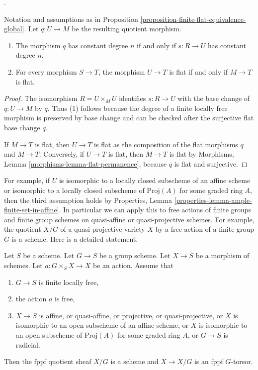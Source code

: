 \begin{lemma}
\label{lemma-finite-flat-equivalence-rank-flatness}
\begin{reference}
\cite[Expos\'e 212, Corollaire 5.5, p. 112]{FGA}.
\end{reference}
Notation and assumptions as in
Proposition \ref{proposition-finite-flat-equivalence-global}. Let
$q : U \to M$ be the resulting quotient morphism.
\begin{enumerate}
\item The morphism $q$ has constant degree $n$ if and only if
$s : R \to U$ has constant degree $n$.
\item For every morphism $S \to T$, the morphism $U \to T$ is flat if
and only if $M \to T$ is flat.
\end{enumerate}
\end{lemma}

\begin{proof}
The isomorphism $R = U \times_M U$ identifies $s : R \to U$ with the
base change of $q : U \to M$ by $q$. Thus (1) follows because the degree of
a finite locally free morphism is preserved by base change and can be checked
after the surjective flat base change $q$.

If $M \to T$ is flat, then $U \to T$ is flat as the composition of the flat
morphisms $q$ and $M \to T$. Conversely, if $U \to T$ is flat, then
$M \to T$ is flat by Morphisms, Lemma
\ref{morphisms-lemma-flat-permanence}, because $q$ is flat and surjective.
\end{proof}

\noindent
For example, if $U$ is isomorphic to a locally closed subscheme of an
affine scheme or isomorphic to a locally closed subscheme of
$\text{Proj}(A)$ for some graded ring $A$, then the third assumption holds by
Properties, Lemma \ref{properties-lemma-ample-finite-set-in-affine}.
In particular we can apply this to free actions of finite groups and
finite group schemes on quasi-affine or quasi-projective schemes.
For example, the quotient $X/G$ of a quasi-projective variety
$X$ by a free action of a finite group $G$ is a scheme. Here is a
detailed statement.

\begin{lemma}
\label{lemma-quotient-scheme}
Let $S$ be a scheme. Let $G \to S$ be a group scheme. Let $X \to S$ be
a morphism of schemes. Let $a : G \times_S X \to X$ be an action. Assume that
\begin{enumerate}
\item $G \to S$ is finite locally free,
\item the action $a$ is free,
\item $X \to S$ is affine, or quasi-affine, or projective, or
quasi-projective, or $X$ is isomorphic to an open subscheme of an
affine scheme, or $X$ is isomorphic to an open subscheme of $\text{Proj}(A)$
for some graded ring $A$, or $G \to S$ is radicial.
\end{enumerate}
Then the fppf quotient sheaf $X/G$ is a scheme and $X \to X/G$
is an fppf $G$-torsor.
\end{lemma}

